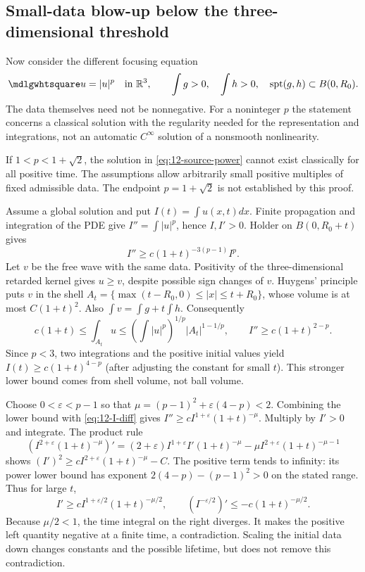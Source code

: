 \subsection{Small-data blow-up below the three-dimensional threshold}
Now consider the different focusing equation
\begin{equation}\label{eq:12-source-power}
 \PDEWave u=|u|^p\quad\hbox{in }\R^3,
 \qquad \int g>0,\quad\int h>0,
 \quad\operatorname{spt}(g,h)\subset B(0,R_0).
\end{equation}
The data themselves need not be nonnegative. For a noninteger $p$
the statement concerns a classical solution with the regularity
needed for the representation and integrations, not an automatic
$C^\infty$ solution of a nonsmooth nonlinearity.
\begin{theorem}
If $1<p<1+\sqrt2$, the solution in \eqref{eq:12-source-power}
cannot exist classically for all positive time. The assumptions allow
arbitrarily small positive multiples of fixed admissible data.
The endpoint $p=1+\sqrt2$ is not established by this proof.
\end{theorem}
\begin{expandedproof}
Assume a global solution and put $I(t)=\int u(x,t)dx$.
Finite propagation and integration of the PDE give
$I''=\int|u|^p$, hence $I,I'>0$. Holder on $B(0,R_0+t)$ gives
\begin{equation}\label{eq:12-I-diff}
 I''\ge c(1+t)^{-3(p-1)}I^p.
\end{equation}
Let $v$ be the free wave with the same data. Positivity of the
three-dimensional retarded kernel gives $u\ge v$, despite possible
sign changes of $v$. Huygens' principle puts $v$ in the shell
$A_t=\{\max(t-R_0,0)\le|x|\le t+R_0\}$, whose volume is at most
$C(1+t)^2$. Also $\int v=\int g+t\int h$.
Consequently
\[
 c(1+t)\le\int_{A_t}u
 \le\left(\int|u|^p\right)^{1/p}|A_t|^{1-1/p},
 \qquad I''\ge c(1+t)^{2-p}.
\]
Since $p<3$, two integrations and the positive initial values yield
$I(t)\ge c(1+t)^{4-p}$ (after adjusting the constant for small $t$).
This stronger lower bound comes from shell volume, not ball volume.

Choose $0<\varepsilon<p-1$ so that
$\mu=(p-1)^2+\varepsilon(4-p)<2$. Combining the lower bound with
\eqref{eq:12-I-diff} gives
$I''\ge c I^{1+\varepsilon}(1+t)^{-\mu}$.
Multiply by $I'>0$ and integrate. The product rule
\[
 (I^{2+\varepsilon}(1+t)^{-\mu})'
 =(2+\varepsilon)I^{1+\varepsilon}I'(1+t)^{-\mu}
       -\mu I^{2+\varepsilon}(1+t)^{-\mu-1}
\]
shows
$(I')^2\ge cI^{2+\varepsilon}(1+t)^{-\mu}-C$.
The positive term tends to infinity: its power lower bound has
exponent $2(4-p)-(p-1)^2>0$ on the stated range. Thus for large $t$,
\[
 I'\ge cI^{1+\varepsilon/2}(1+t)^{-\mu/2},\qquad
 (I^{-\varepsilon/2})'\le-c(1+t)^{-\mu/2}.
\]
Because $\mu/2<1$, the time integral on the right diverges.
It makes the positive left quantity negative at a finite time,
a contradiction. Scaling the initial data down changes constants
and the possible lifetime, but does not remove this contradiction.
\end{expandedproof}
